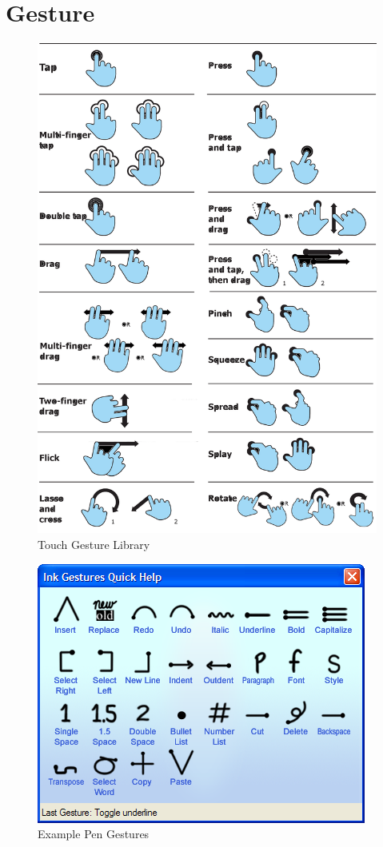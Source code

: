 \documentclass[12pt]{report}
\begin{document}
\section{Gesture}

\begin{figure}
\includegraphics[width=0.9\linewidth]{GestureLibrary}
\caption{Touch Gesture Library}
\end{figure}
\begin{figure}
\includegraphics[width=0.9\linewidth]{pengestures}
\caption{Example Pen Gestures}
\end{figure}
\end{document}
